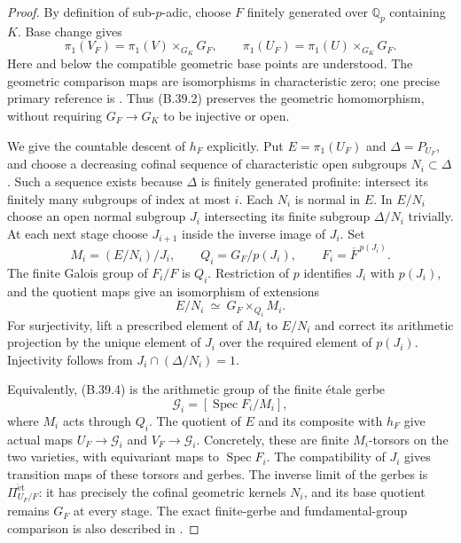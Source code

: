 \documentclass[11pt,oneside]{article}
\begin{document}
\begin{proof}
By definition of sub-$p$-adic, choose $F$ finitely
generated over $\mathbb Q_p$ containing $K$. Base
change gives
\[
 \pi_1(V_F)=\pi_1(V)\times_{G_K}G_F,
 \qquad
 \pi_1(U_F)=\pi_1(U)\times_{G_K}G_F.
 \tag{B.39.2}
\]
Here and below the compatible geometric base points
are understood. The geometric comparison maps are
isomorphisms in characteristic zero; one precise
primary reference is \cite[Theorem 1.1 and its
characteristic-zero specialization]{B_LandesmanBaseChange}.
Thus (B.39.2) preserves the geometric homomorphism,
without requiring $G_F\to G_K$ to be injective or open.

We give the countable descent of $h_F$ explicitly.
Put $E=\pi_1(U_F)$ and $\Delta=P_{U_F}$, and choose
a decreasing cofinal sequence of characteristic open
subgroups $N_i\subset\Delta$. Such a sequence exists
because $\Delta$ is finitely generated profinite:
intersect its finitely many subgroups of index at
most $i$. Each $N_i$ is normal in $E$.
In $E/N_i$ choose an open normal subgroup $J_i$
intersecting its finite subgroup $\Delta/N_i$
trivially. At each next stage choose $J_{i+1}$ inside
the inverse image of $J_i$. Set
\[
 M_i=(E/N_i)/J_i,\qquad
 Q_i=G_F/p(J_i),
 \qquad F_i=\overline F^{\,p(J_i)}.
 \tag{B.39.3}
\]
The finite Galois group of $F_i/F$ is $Q_i$.
Restriction of $p$ identifies $J_i$ with $p(J_i)$,
and the quotient maps give an isomorphism of
extensions
\[
 E/N_i\ \simeq\ G_F\times_{Q_i}M_i.
 \tag{B.39.4}
\]
For surjectivity, lift a prescribed element of $M_i$
to $E/N_i$ and correct its arithmetic projection by
the unique element of $J_i$ over the required
element of $p(J_i)$. Injectivity follows from
$J_i\cap(\Delta/N_i)=1$.

Equivalently, (B.39.4) is the arithmetic group of
the finite \'etale gerbe
\[
 \mathcal G_i=[\operatorname{Spec}F_i/M_i],
 \tag{B.39.5}
\]
where $M_i$ acts through $Q_i$. The quotient of $E$
and its composite with $h_F$ give actual maps
$U_F\to\mathcal G_i$ and $V_F\to\mathcal G_i$.
Concretely, these are finite $M_i$-torsors on the
two varieties, with equivariant maps to
$\operatorname{Spec}F_i$. The compatibility of
$J_i$ gives transition maps of these torsors and
gerbes. The inverse limit of the gerbes is
$\Pi^{\mathrm{\acute et}}_{U_F/F}$: it has precisely
the cofinal geometric kernels $N_i$, and its base
quotient remains $G_F$ at every stage. The exact
finite-gerbe and fundamental-group comparison is
also described in \cite[\S8 and Lemma 9.4]{B_BorneVistoli}.


\end{proof}
\end{document}
